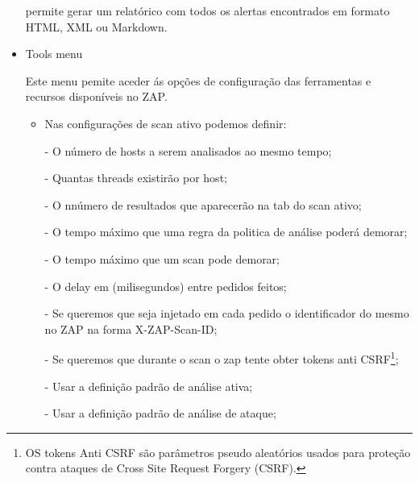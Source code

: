 \begin{itemize}
\par permite gerar um relatórico com todos os alertas encontrados em formato HTML, XML ou Markdown.

\item Tools menu \newline

\par Este menu pemite aceder ás opções de configuração das ferramentas e recursos disponíveis no ZAP.
\begin{itemize}
\item Nas configurações de scan ativo podemos definir:\newline

\par - O número de hosts a serem analisados ao mesmo tempo;\newline

\par - Quantas threads existirão por host;\newline

\par - O nnúmero de resultados que aparecerão na tab do scan ativo;\newline

\par - O tempo máximo que uma regra da politica de análise poderá demorar;\newline

\par - O tempo máximo que um scan pode demorar;\newline

\par - O delay em (milisegundos) entre pedidos feitos;\newline

\par - Se queremos que seja injetado em cada pedido o identificador do mesmo no ZAP na forma X-ZAP-Scan-ID;\newline

\par - Se queremos que durante o scan o zap tente obter tokens anti CSRF\footnote[2]{OS tokens Anti CSRF são parâmetros pseudo aleatórios usados para proteção contra ataques de Cross Site Request Forgery (CSRF).};\newline

\par - Usar a definição padrão de análise ativa;\newline

\par - Usar a definição padrão de análise de ataque; \newline



\end{itemize}
\end{itemize}
